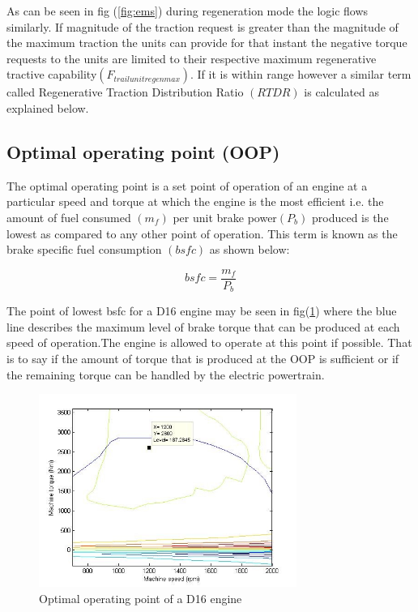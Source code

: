 \documentclass[ExampleMasters.tex]{subfiles}
\begin{document}
As can be seen in fig (\ref{fig:ems}) during regeneration mode the logic flows similarly. If magnitude of the traction request is greater than the magnitude of the maximum traction the units can provide for that instant the negative torque requests to the units are limited to their respective maximum regenerative tractive capability$(F_{trailunitregenmax})$. If it is within range however a similar term called Regenerative Traction Distribution Ratio $(RTDR)$ is calculated as explained below.

\subsection{Optimal operating point (OOP)} \label{sec:oop}
The optimal operating point is a set point of operation of an engine at a particular speed and torque at which the engine is the most efficient i.e. the amount of fuel consumed $(m_f)$ per unit brake power$(P_b)$ produced is the lowest as compared to any other point of operation. This term is known as the brake specific fuel consumption $(bsfc)$ as shown below:

\begin{equation} \label{eq:bsfc}
bsfc=\frac{m_f}{P_b}
\end{equation}
 
The point of lowest bsfc for a D16 engine may be seen in fig(\ref{fig:enginemap}) where the blue line describes the maximum level of brake torque that can be produced at each speed of operation.The engine is allowed to operate at this point if possible. That is to say if the amount of torque that is produced at the OOP is sufficient or if the remaining torque can be handled by the electric powertrain. 

\begin{figure}
	\begin{center}
		\includegraphics[width=0.75\textwidth]{figures/VehicleModel/enginemap.jpg}
	\end{center}
	\caption{Optimal operating point of a D16 engine}
	\label{fig:enginemap}
\end{figure}
\end{document}
